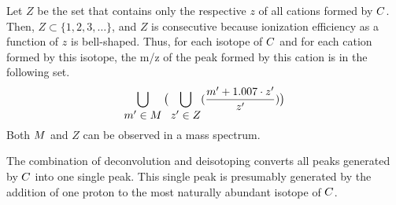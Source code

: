 {Let \(Z\) be the set that contains only the respective \(z\) of all cations formed by \(C\).
Then, \(Z\subset\{1,2,3,\dots\}\), and \(Z\) is consecutive because ionization efficiency as a function of \(z\) is bell-shaped.
Thus, for each isotope of \(C\) and for each cation formed by this isotope, the \gls{m/z} of the peak formed by this cation is in the following set.
\[
	\bigcup_{\substack{\textstyle m' \in M}}\big(\bigcup_{\textstyle z' \in Z}^{}(\frac{m'+1.007\cdot z'}{z'})\big)\] 
Both \(M\) and \(Z\) can be observed in a mass spectrum. 

The combination of deconvolution and deisotoping converts all peaks generated by \(C\) into one single peak.
This single peak is presumably generated by the addition of one proton to the most naturally abundant isotope of \(C\).
}

\section{\texorpdfstring{}{PSM}} 
\label{sec:MS:PSM}
	
